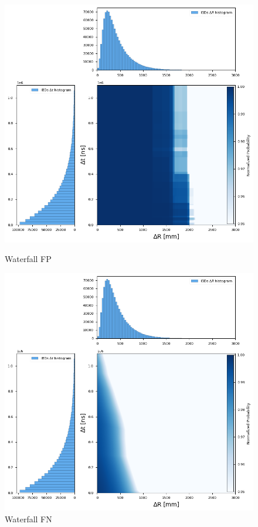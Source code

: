 \begin{figure}[h!]
	\centering
	\begin{minipage}{0.5\textwidth}
		\centering
		\includegraphics[width=\linewidth]{Images/dr_dt_xgboost}
		\caption{Waterfall FP}
		\label{fig:dr_dt_xgboost}
	\end{minipage}%
	\begin{minipage}{0.5\textwidth}
		\centering
		\includegraphics[width=\linewidth]{Images/dr_dt_pytorch}
		\caption{Waterfall FN}
		\label{fig:dr_dt_pytorch}
	\end{minipage}
\end{figure}
